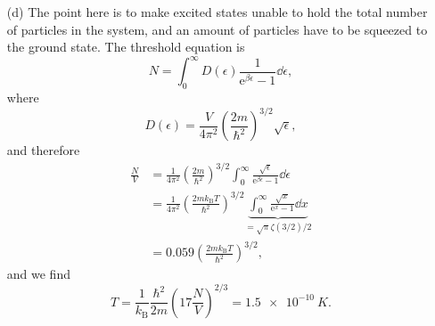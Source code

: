 \documentclass[hyperref, a4paper]{article}
\newcommand*{\ee}{\mathrm{e}}
\begin{document}
\begin{itemize}
\item[(d)] The point here is to make excited states unable to hold the total number of particles in the system,
and an amount of particles have to be squeezed to the ground state.
The threshold equation is 
\begin{equation}
    N = \int_0^\infty D(\epsilon) \frac{1}{\ee^{\beta \epsilon} - 1} \dd{\epsilon},
\end{equation}
where 
\begin{equation}
    D(\epsilon) = \frac{V}{4\pi^2} \left(\frac{2m}{\hbar^2}\right)^{3/2} \sqrt{\epsilon},
\end{equation}
and therefore 
\begin{equation}
    \begin{aligned}
        \frac{N}{V} &= \frac{1}{4\pi^2} \left(\frac{2m}{\hbar^2}\right)^{3/2} 
        \int_0^\infty \frac{\sqrt{\epsilon}}{\ee^{\beta \epsilon} - 1} \dd{\epsilon} \\
        &= \frac{1}{4\pi^2} \left(\frac{2m k_{\text{B}} T}{\hbar^2}\right)^{3/2} 
        \underbrace{\int_0^\infty \frac{\sqrt{x}}{\ee^{x} - 1} \dd{x}}_{= \sqrt{\pi} \zeta(3/2) / 2} \\
        &= 0.059 \left(\frac{2m k_{\text{B}} T}{\hbar^2}\right)^{3/2} ,
    \end{aligned}
\end{equation}
and we find 
\begin{equation}
    T = \frac{1}{k_{\text{B}}} \frac{\hbar^2}{2m} \left( 17 \frac{N}{V} \right)^{2/3}
    = \SI{1.5e-10}{K}.
\end{equation}

\end{itemize}
\end{document}
